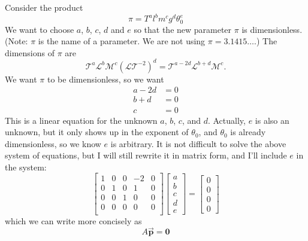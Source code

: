 \documentclass[reqno]{immbook}
\newcommand{\BP}{\vec{\textbf{p}}}
\numberwithin{equation}{chapter}
\numberwithin{question}{section}
\numberwithin{theorem}{chapter}
\numberwithin{figure}{chapter}
\theoremstyle{definition}
\begin{document}
Consider the product
\begin{equation}
   \pi = T^a l^b m^c g^d \theta_0^e
\end{equation}
We want to choose $a$, $b$, $c$, $d$ and $e$ so that
the new parameter $\pi$ is dimensionless.
(Note: $\pi$ is the name of a parameter.
We are not using $\pi = 3.1415\ldots$.)
The dimensions of $\pi$ are
\begin{equation}
  \mathcal{T}^a \mathcal{L}^b \mathcal{M}^c
     \left(\mathcal{LT}^{-2}\right)^d
     = \mathcal{T}^{a-2d}\mathcal{L}^{b+d}\mathcal{M}^c.
\end{equation}
We want $\pi$ to be dimensionless, so we want
\begin{equation}
\begin{split}
  a-2d & = 0 \\
  {b+d} & = 0 \\
  c  & = 0
\end{split}
\end{equation}
This is a linear equation for the unknown $a$, $b$, $c$, and
$d$. Actually, $e$ is also an unknown, but it only shows
up in the exponent of $\theta_0$, and $\theta_0$ is 
already dimensionless, so we know $e$ is arbitrary.
It is not difficult to solve the above system of
equations, but I will still rewrite it in matrix form, and
I'll include $e$ in the system:
\begin{equation}
   \begin{bmatrix}
       1 & 0 & 0 & -2 & 0 \\
       0 & 1 & 0 & 1  & 0 \\
       0 & 0 & 1 & 0  & 0 \\
       0 & 0 & 0 & 0 & 0  \\
   \end{bmatrix}
   \begin{bmatrix}
       a \\ b \\ c \\ d \\ e
   \end{bmatrix}
   =
   \begin{bmatrix}
       0 \\ 0 \\ 0 \\ 0
   \end{bmatrix}
   \label{eqn:linear_sys_for_nondim_params}
\end{equation}
which we can write more concisely as
\begin{equation}
   A \BP = \mathbf{0}
\end{equation}
\end{document}
